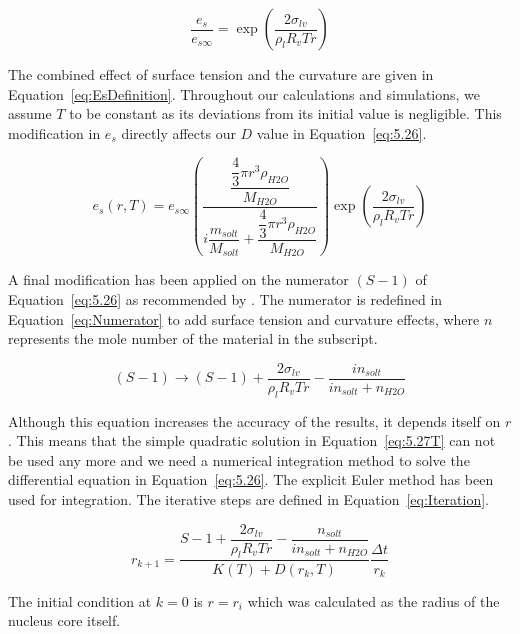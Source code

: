 \documentclass[]{article}
\begin{document}
\begin{equation}
    \label{eq:Curvature}
    \dfrac{e_{s}}{e_{s\infty}}=\exp \left( \dfrac{2\sigma_{lv}}{\rho_{l}R_{v}Tr} \right)
\end{equation}

The combined effect of surface tension and the curvature are given in
Equation~\eqref{eq:EsDefinition}. Throughout our calculations and simulations,
we assume $T$ to be constant as its deviations from its initial value is
negligible. This modification in $e_{s}$ directly affects our $D$ value in
Equation~\eqref{eq:5.26}.

\begin{equation}
    \label{eq:EsDefinition}
    e_{s}(r,T)=e_{s\infty}\left(\dfrac{\dfrac{\dfrac{4}{3}\pi r^{3} \rho_{H2O}}{M_{H2O}}}{i \dfrac{m_{solt}}{M_{solt}} + \dfrac{\dfrac{4}{3}\pi r^{3} \rho_{H2O}}{M_{H2O}}}\right) \exp \left( \dfrac{2\sigma_{lv}}{\rho_{l}R_{v}Tr} \right)
\end{equation}

A final modification has been applied on the numerator $(S-1)$ of
Equation~\eqref{eq:5.26} as recommended by \cite{Mason}. The numerator is
redefined in Equation~\eqref{eq:Numerator} to add surface tension and curvature
effects, where $n$ represents the mole number of the material in the subscript.

\begin{equation}
    \label{eq:Numerator}
    (S-1) \rightarrow (S-1)+\dfrac{2\sigma_{lv}}{\rho_{l}R_{v}Tr}-\dfrac{i n_{solt}}{i n_{solt}+n_{H2O}}
\end{equation}

Although this equation increases the accuracy of the results, it depends itself
on $r$. This means that the simple quadratic solution in
Equation~\eqref{eq:5.27T} can not be used any more and we need a numerical
integration method to solve the differential equation in
Equation~\eqref{eq:5.26}. The explicit Euler method has been used for
integration. The iterative steps are defined in Equation~\eqref{eq:Iteration}.

\begin{equation}
    \label{eq:Iteration}
    r_{k+1}= \dfrac{S - 1+\dfrac{2\sigma_{lv}}{\rho_{l}R_{v}Tr}-\dfrac{n_{solt}}{i n_{solt}+n_{H2O}}}{K(T) + D(r_{k},T)}\dfrac{\Delta t}{r_{k}}
\end{equation}

The initial condition at $k=0$ is $r=r_{i}$ which was calculated as the radius
of the nucleus core itself.
\end{document}

